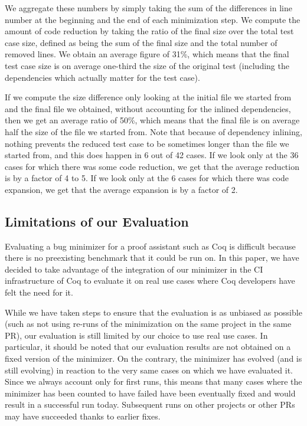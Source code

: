 \documentclass[a4paper,USenglish,cleveref,autoref,thm-restate]{lipics-v2021}
\begin{document}
We aggregate these numbers by simply taking the sum of the differences in line number at the beginning and the end of each minimization step. We compute the amount of code reduction by taking the ratio of the final size over the total test case size, defined as being the sum of the final size and the total number of removed lines. We obtain an average figure of 31\%, which means that the final test case size is on average one-third the size of the original test (including the dependencies which actually matter for the test case).

If we compute the size difference only looking at the initial file we started from and the final file we obtained, without accounting for the inlined dependencies, then we get an average ratio of 50\%, which means that the final file is on average half the size of the file we started from. Note that because of dependency inlining, nothing prevents the reduced test case to be sometimes longer than the file we started from, and this does happen in 6 out of 42 cases. If we look only at the 36 cases for which there was some code reduction, we get that the average reduction is by a factor of 4 to 5. If we look only at the 6 cases for which there was code expansion, we get that the average expansion is by a factor of 2.

\subsection{Limitations of our Evaluation}

Evaluating a bug minimizer for a proof assistant such as Coq is difficult because there is no preexisting benchmark that it could be run on. In this paper, we have decided to take advantage of the integration of our minimizer in the CI infrastructure of Coq to evaluate it on real use cases where Coq developers have felt the need for it.

While we have taken steps to ensure that the evaluation is as unbiased as possible (such as not using re-runs of the  minimization on the same project in the same PR), our evaluation is still limited by our choice to use real use cases. In particular, it should be noted that our evaluation results are not obtained on a fixed version of the minimizer. On the contrary, the minimizer has evolved (and is still evolving) in reaction to the very same cases on which we have evaluated it.
Since we always account only for first runs, this means that many cases where the minimizer has been counted to have failed have been eventually fixed and would result in a successful run today. Subsequent runs on other projects or other PRs may have succeeded thanks to earlier fixes.
\end{document}
